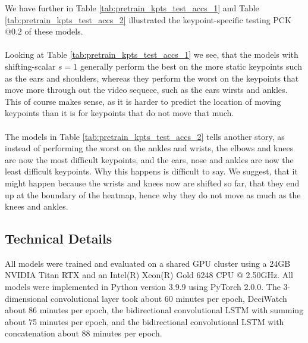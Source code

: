\documentclass[./main.tex]{subfiles}
\begin{document}
\noindent We have further in Table \ref{tab:pretrain_kpts_test_accs_1} and Table \ref{tab:pretrain_kpts_test_accs_2} illustrated the keypoint-specific testing PCK$@0.2$ of these models.
\\
\\
Looking at Table \ref{tab:pretrain_kpts_test_accs_1} we see, that the models with shifting-scalar $s = 1$ generally perform the best on the more static keypoints such as the ears and shoulders, whereas they perform the worst on the keypoints that move more through out the video sequece, such as the ears wirsts and ankles. This of course makes sense, as it is harder to predict the location of moving keypoints than it is for keypoints that do not move that much.
\\
\\
The models in Table \ref{tab:pretrain_kpts_test_accs_2} tells another story, as instead of performing the worst on the ankles and wrists, the elbows and knees are now the most difficult keypoints, and the ears, nose and ankles are now the least difficult keypoints. Why this happens is difficult to say. We suggest, that it might happen because the wrists and knees now are shifted so far, that they end up at the boundary of the heatmap, hence why they do not move as much as the knees and ankles. 

\subsection{Technical Details}
All models were trained and evaluated on a shared GPU cluster using a 24GB NVIDIA Titan RTX and an Intel(R) Xeon(R) Gold 6248 CPU @ 2.50GHz. All models were implemented in Python version 3.9.9 using PyTorch 2.0.0. The 3-dimensional convolutional layer took about 60 minutes per epoch, DeciWatch about 86 minutes per epoch, the bidirectional convolutional LSTM with summing about 75 minutes per epoch, and the bidirectional convolutional LSTM with concatenation about 88 minutes per epoch.
\end{document}
